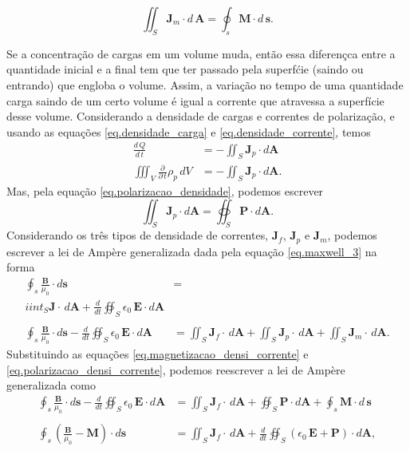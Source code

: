 \begin{equation}\label{eq.magnetizacao_densi_corrente}
\iint_S\mathbf{J}_m\cdot d\,\mathbf{A}=\oint_s \mathbf{M}\cdot d\,\mathbf{s}.
\end{equation}


Se a concentra\c{c}\~ao de cargas em um volume muda, ent\~ao essa diferen\c{c}ca entre a quantidade inicial e a final tem que ter passado pela superf\'cie (saindo ou entrando) que engloba o volume. Assim, a varia\c{c}\~ao no tempo de uma quantidade carga saindo de um certo volume \'e igual a corrente que atravessa a superf\'icie desse volume. Considerando a densidade de cargas e correntes de polariza\c{c}\~ao, e usando as equa\c{c}\~oes \ref{eq.densidade_carga} e \ref{eq.densidade_corrente}, temos
\begin{align*}
\frac{d\,Q}{d\,t}&=-\iint_S\mathbf{J}_p\cdot d\mathbf{A}\\
\iiint_V\frac{\partial}{\partial\,t}\rho_p\,dV&=-\iint_S\mathbf{J}_p\cdot d\mathbf{A}.
\end{align*}
Mas, pela equa\c{c}\~ao \ref{eq.polarizacao_densidade}, podemos escrever
\begin{equation}\label{eq.polarizacao_densi_corrente}
\iint_S\mathbf{J}_p\cdot d\mathbf{A}=\oiint_S\mathbf{P}\cdot d\mathbf{A}.
\end{equation} 
Considerando os tr\^es tipos de densidade de correntes, $\mathbf{J}_f$, $\mathbf{J}_p$ e $\mathbf{J}_m$, podemos escrever a lei de Amp\`ere generalizada dada pela equa\c{c}\~ao \ref{eq.maxwell_3} na forma
\begin{align*}
\oint_s\frac{\mathbf{B}}{\mu_0}\cdot d\mathbf{s}&=\\iint_S\mathbf{J}\cdot\,d\mathbf{A}+\frac{d}{dt}\oiint_S\epsilon_0\,\textbf{E}\cdot\textit{d}\textbf{A}\\\\
\oint_s\frac{\mathbf{B}}{\mu_0}\cdot d\mathbf{s}-\frac{d}{dt}\oiint_S\epsilon_0\,\textbf{E}\cdot\textit{d}\textbf{A}&=\iint_S\mathbf{J}_f\cdot\,d\mathbf{A}+\iint_S\mathbf{J}_p\cdot\,d\mathbf{A}+\iint_S\mathbf{J}_m\cdot\,d\mathbf{A}.
\end{align*}
Substituindo as equa\c{c}\~oes \ref{eq.magnetizacao_densi_corrente} e \ref{eq.polarizacao_densi_corrente}, podemos reescrever a lei de Amp\`ere generalizada como
\begin{align*}
\oint_s\frac{\mathbf{B}}{\mu_0}\cdot d\mathbf{s}-\frac{d}{dt}\oiint_S\epsilon_0\,\textbf{E}\cdot\textit{d}\textbf{A}&=\iint_S\mathbf{J}_f\cdot\,d\mathbf{A}+\oiint_S\mathbf{P}\cdot d\mathbf{A}+\oint_s \mathbf{M}\cdot d\,\mathbf{s}\\\\
\oint_s(\frac{\mathbf{B}}{\mu_0}-\mathbf{M})\cdot d\mathbf{s}&=\iint_S\mathbf{J}_f\cdot\,d\mathbf{A}+\frac{d}{dt}\oiint_S(\epsilon_0\,\textbf{E}+\mathbf{P})\cdot\textit{d}\textbf{A},
\end{align*}
